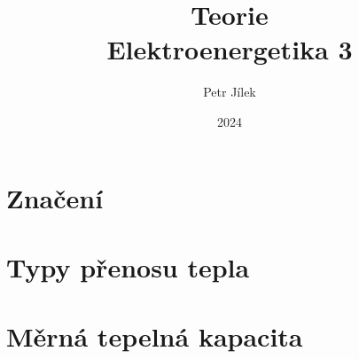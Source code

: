 \documentclass{article}
\title{\textbf{Teorie}\\Elektroenergetika 3}
\author{Petr Jílek}
\date{2024}
\begin{document}



\maketitle

\tableofcontents

\newpage


\section{Značení}




\section{Typy přenosu tepla}

\section{Měrná tepelná kapacita}
\end{document}
